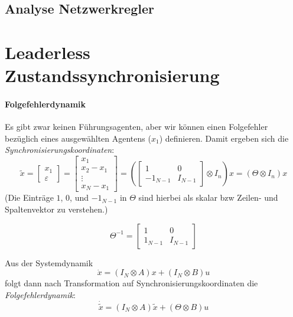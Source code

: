 \subsection{Analyse Netzwerkregler}

\section{Leaderless Zustandssynchronisierung}
\paragraph{Folgefehlerdynamik}
Es gibt zwar keinen Führungsagenten, aber wir können einen Folgefehler
bezüglich eines ausgewählten Agentens ($x_1$) definieren.
Damit ergeben sich die \emph{Synchronisierungskoordinaten}:
\begin{equation}
    \tilde{x} = \begin{bmatrix}
        x_1 \\
        \varepsilon
    \end{bmatrix}
    = \begin{bmatrix}
        x_1 \\
        x_2 - x_1 \\
        \vdots \\
        x_N - x_1
    \end{bmatrix}
    = \left(\begin{bmatrix}
        1 & 0 \\
        -1_{N-1} & I_{N-1}
    \end{bmatrix}
    \otimes I_n
    \right) x
    = (\Theta \otimes I_n)x
\end{equation}
(Die Einträge $1$, $0$, und $-1_{N-1}$ in $\Theta$ sind hierbei als skalar bzw Zeilen- und Spaltenvektor zu verstehen.)

\begin{equation}
    \Theta^{-1} = \begin{bmatrix}
        1 & 0 \\
        1_{N-1} & I_{N-1}
    \end{bmatrix}    
\end{equation}

Aus der Systemdynamik
\begin{equation}
    \dot{x} = (I_N \otimes A) x + (I_N \otimes B)u
\end{equation}
folgt dann nach Transformation auf Synchronisierungskoordinaten die
\emph{Folgefehlerdynamik}:
\begin{equation}
    \dot{\tilde{x}} = (I_N \otimes A) \tilde{x} + (\Theta \otimes B)u
\end{equation}

